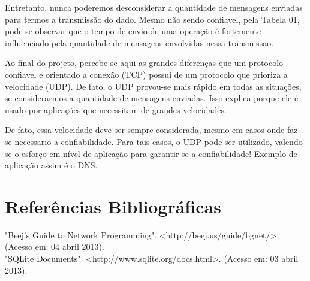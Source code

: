 \documentclass[10pt,a4paper]{report}
\begin{document}
	Entretanto, nunca poderemos desconsiderar a quantidade de mensagens enviadas para termos a transmissão do dado. Mesmo não sendo confiavel, pela Tabela 01, pode-se observar que o tempo de envio de uma operação é fortemente influenciado pela quantidade de mensagens envolvidas nessa transmissao.

	Ao final do projeto, percebe-se aqui as grandes diferenças que um protocolo confiavel e orientado a conexão (TCP) possui de um protocolo que prioriza a velocidade (UDP). De fato, o UDP provou-se mais rápido em todas as situações, se considerarmos a quantidade de mensagens enviadas. Isso explica porque ele é usado por aplicações que necessitam de grandes velocidades.

	De fato, essa velocidade deve ser sempre considerada, mesmo em casos onde faz-se necessario a confiabilidade. Para tais casos, o UDP pode ser utilizado, valendo-se o esforço em nível de aplicação para garantir-se a confiabilidade! Exemplo de aplicação assim é o DNS.

\chapter{Referências Bibliográficas}
"Beej's Guide to Network Programming". <http://beej.us/guide/bgnet/>. (Acesso em: 04 abril 2013). \\
"SQLite Documents". <http://www.sqlite.org/docs.html>. (Acesso em: 03 abril 2013).
\end{document}
